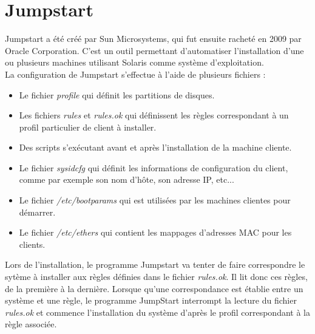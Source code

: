 \documentclass[a4paper,12pt,one side,titlepage]{report}
\begin{document}
\section{Jumpstart}
Jumpstart a été créé par Sun Microsystems, qui fut ensuite racheté en 2009 par Oracle Corporation. C'est un outil permettant d'automatiser l'installation d'une ou plusieurs machines utilisant Solaris comme système d'exploitation.\\
La configuration de Jumpstart s'effectue à l'aide de plusieurs fichiers :\\
\begin{itemize}
  \item Le fichier \textit{profile} qui définit les partitions de disques.
  \item Les fichiers \textit{rules} et \textit{rules.ok} qui définissent les règles correspondant à un profil particulier de client à installer.
  \item Des scripts s'exécutant avant et après l'installation de la machine cliente.
  \item Le fichier \textit{sysidcfg} qui définit les informations de configuration du client, comme par exemple son nom d'hôte, son adresse IP, etc...
  \item Le fichier \textit{/etc/bootparams} qui est utilisées par les machines clientes pour démarrer.
  \item Le fichier \textit{/etc/ethers} qui contient les mappages d'adresses MAC pour les clients.\\
\end{itemize}
Lors de l'installation, le programme Jumpstart va tenter de faire correspondre le sytème à installer aux règles définies dans le fichier \textit{rules.ok}. Il lit donc ces règles, de la première à la dernière. Lorsque qu'une correspondance est établie entre un système et une règle, le programme JumpStart interrompt la lecture du fichier \textit{rules.ok} et commence l'installation du système d'après le profil correspondant à la règle associée.\\
\end{document}
